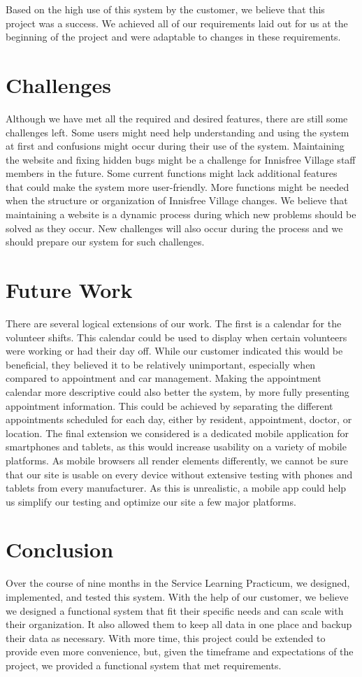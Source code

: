 \documentclass{sig-alternate}
\begin{document}
Based on the high use of this system by the customer, we believe that this project was a success. We achieved all of our requirements laid out for us at the beginning of the project and were adaptable to changes in these requirements.

\section{Challenges}
Although we have met all the required and desired features, there are still some challenges left. Some users might need help understanding and using the system at first and confusions might occur during their use of the system. Maintaining the website and fixing hidden bugs might be a challenge for Innisfree Village staff members in the future. Some current functions might lack additional features that could make the system more user-friendly. More functions might be needed when the structure or organization of Innisfree Village changes. We believe that maintaining a website is a dynamic process during which new problems should be solved as they occur. New challenges will also occur during the process and we should prepare our system for such challenges.

\section{Future Work}
There are several logical extensions of our work. The first is a calendar for the volunteer shifts. This calendar could be used to display when certain volunteers were working or had their day off. While our customer indicated this would be beneficial, they believed it to be relatively unimportant, especially when compared to appointment and car management. Making the appointment calendar more descriptive could also better the system, by more fully presenting appointment information. This could be achieved by separating the different appointments scheduled for each day, either by resident, appointment, doctor, or location. The final extension we considered is a dedicated mobile application for smartphones and tablets, as this would increase usability on a variety of mobile platforms. As mobile browsers all render elements differently, we cannot be sure that our site is usable on every device without extensive testing with phones and tablets from every manufacturer. As this is unrealistic, a mobile app could help us simplify our testing and optimize our site a few major platforms.

\section{Conclusion}
Over the course of nine months in the Service Learning Practicum, we designed, implemented, and tested this system. With the help of our customer, we believe we designed a functional system that fit their specific needs and can scale with their organization. It also allowed them to keep all data in one place and backup their data as necessary. With more time, this project could be extended to provide even more convenience, but, given the timeframe and expectations of the project, we provided a functional system that met requirements. 
\end{document}
